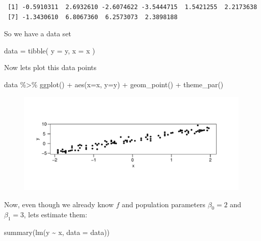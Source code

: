 \documentclass[
  letterpaper,
  DIV=11,
  numbers=noendperiod]{scrreprt}
\newenvironment{Shaded}{\begin{snugshade}}{\end{snugshade}}
\newcommand{\AttributeTok}[1]{\textcolor[rgb]{0.65,0.35,0.00}{#1}}
\newcommand{\FunctionTok}[1]{\textcolor[rgb]{0.02,0.16,0.49}{#1}}
\newcommand{\NormalTok}[1]{\textcolor[rgb]{0.33,0.33,0.33}{#1}}
\newcommand{\OtherTok}[1]{\textcolor[rgb]{0.85,0.12,0.09}{#1}}
\newcommand{\SpecialCharTok}[1]{\textcolor[rgb]{0.00,0.46,0.62}{#1}}
\begin{document}
\begin{verbatim}
 [1] -0.5910311  2.6932610 -2.6074622 -3.5444715  1.5421255  2.2173638
 [7] -1.3430610  6.8067360  6.2573073  2.3898188
\end{verbatim}

So we have a data set

\begin{Shaded}
\begin{Highlighting}[]
\NormalTok{data }\OtherTok{=} \FunctionTok{tibble}\NormalTok{(}
  \AttributeTok{y =}\NormalTok{ y, }\AttributeTok{x =}\NormalTok{ x}
\NormalTok{)}
\end{Highlighting}
\end{Shaded}

Now lets plot this data points

\begin{Shaded}
\begin{Highlighting}[]
\NormalTok{data }\SpecialCharTok{\%\textgreater{}\%} 
  \FunctionTok{ggplot}\NormalTok{() }\SpecialCharTok{+} \FunctionTok{aes}\NormalTok{(}\AttributeTok{x=}\NormalTok{x, }\AttributeTok{y=}\NormalTok{y) }\SpecialCharTok{+} \FunctionTok{geom\_point}\NormalTok{() }\SpecialCharTok{+} \FunctionTok{theme\_par}\NormalTok{()}
\end{Highlighting}
\end{Shaded}

\begin{figure}[H]

{\centering \includegraphics{Chapter3_files/figure-pdf/unnamed-chunk-13-1.pdf}

}

\end{figure}

Now, even though we already know \(f\) and population parameters
\(\beta_0 = 2\) and \(\beta_1 = 3\), lets estimate them:

\begin{Shaded}
\begin{Highlighting}[]
\FunctionTok{summary}\NormalTok{(}\FunctionTok{lm}\NormalTok{(y }\SpecialCharTok{\textasciitilde{}}\NormalTok{ x, }\AttributeTok{data =}\NormalTok{ data))}
\end{Highlighting}
\end{Shaded}
\end{document}
